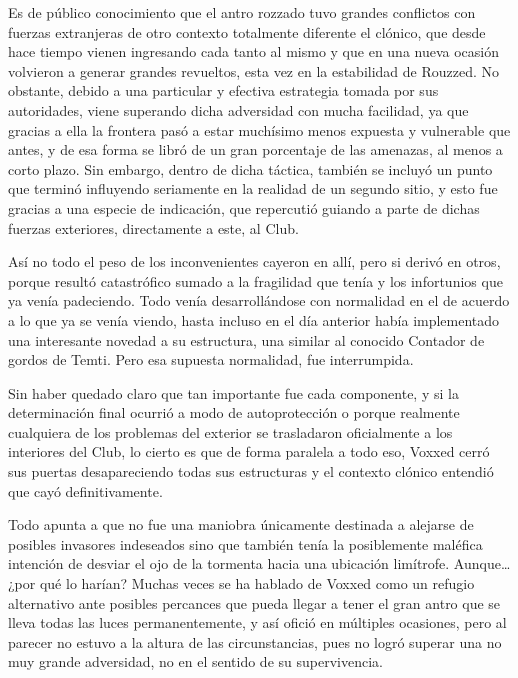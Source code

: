 \documentclass[
  spanish,
]{book}
\begin{document}
Es de público conocimiento que el antro rozzado tuvo grandes conflictos con fuerzas extranjeras de otro contexto totalmente diferente el clónico, que desde hace tiempo vienen ingresando cada tanto al mismo y que en una nueva ocasión volvieron a generar grandes revueltos, esta vez en la estabilidad de Rouzzed. No obstante, debido a una particular y efectiva estrategia tomada por sus autoridades, viene superando dicha adversidad con mucha facilidad, ya que gracias a ella la frontera pasó a estar muchísimo menos expuesta y vulnerable que antes, y de esa forma se libró de un gran porcentaje de las amenazas, al menos a corto plazo. Sin embargo, dentro de dicha táctica, también se incluyó un punto que terminó influyendo seriamente en la realidad de un segundo sitio, y esto fue gracias a una especie de indicación, que repercutió guiando a parte de dichas fuerzas exteriores, directamente a este, al Club.

Así no todo el peso de los inconvenientes cayeron en allí, pero si derivó en otros, porque resultó catastrófico sumado a la fragilidad que tenía y los infortunios que ya venía padeciendo.
Todo venía desarrollándose con normalidad en el de acuerdo a lo que ya se venía viendo, hasta incluso en el día anterior había implementado una interesante novedad a su estructura, una similar al conocido Contador de gordos de Temti. Pero esa supuesta normalidad, fue interrumpida.

Sin haber quedado claro que tan importante fue cada componente, y si la determinación final ocurrió a modo de autoprotección o porque realmente cualquiera de los problemas del exterior se trasladaron oficialmente a los interiores del Club, lo cierto es que de forma paralela a todo eso, Voxxed cerró sus puertas desapareciendo todas sus estructuras y el contexto clónico entendió que cayó definitivamente.

Todo apunta a que no fue una maniobra únicamente destinada a alejarse de posibles invasores indeseados sino que también tenía la posiblemente maléfica intención de desviar el ojo de la tormenta hacia una ubicación limítrofe. Aunque\ldots{} ¿por qué lo harían?
Muchas veces se ha hablado de Voxxed como un refugio alternativo ante posibles percances que pueda llegar a tener el gran antro que se lleva todas las luces permanentemente, y así ofició en múltiples ocasiones, pero al parecer no estuvo a la altura de las circunstancias, pues no logró superar una no muy grande adversidad, no en el sentido de su supervivencia.
\end{document}

